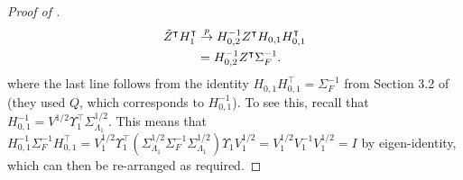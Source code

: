 \documentclass[12pt]{article}
\newcommand*{\tran}{\intercal}
\theoremstyle{plain}
\numberwithin{equation}{section}
\begin{document}
\begin{proof}[Proof of ]
\begin{align*}
\tilde{Z}^\tran H_1^\tran &\convp 
H_{0, 2}^{-1} Z^\tran H_{0, 1} H_{0, 1}^\tran \\
&= H_{0, 2}^{-1} Z^\tran \Sigma_F^{-1}.
\end{align*}
where the last line follows from the identity $H_{0, 1} H_{0, 1}^\tran = \Sigma_F^{-1}$ from Section 3.2 of \textcite{bai_simpler_2020} (they used $Q$, which corresponds to $H_{0, 1}^{-1}$). To see this, recall that $H_{0, 1}^{-1} = V^{1/2} \Upsilon_1^\tran \Sigma_{\Lambda_1}^{1/2}$. This means that $H_{0, 1}^{-1} \Sigma_F^{-1} H_{0, 1}^\tran = V_1^{1/2} \Upsilon_1^\tran \left( \Sigma_{\Lambda_1}^{1/2} \Sigma_F^{-1} \Sigma_{\Lambda_1}^{1/2}\right)  \Upsilon_1 V_1^{1/2} = V_1^{1/2} V_{1}^{-1} V_{1}^{1/2} = I$ by eigen-identity, which can then be re-arranged as required.


\end{proof}
\end{document}
